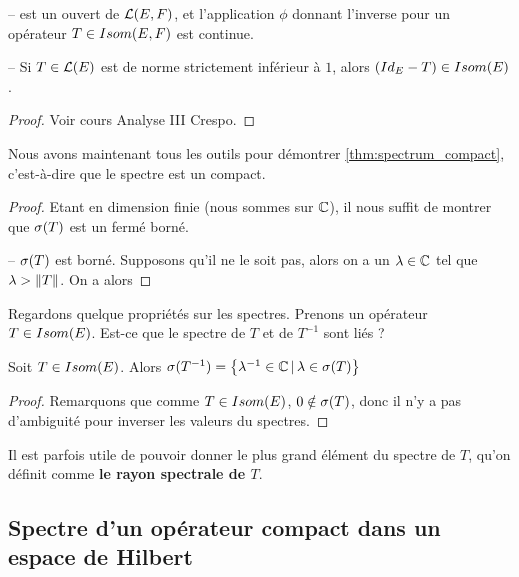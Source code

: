 \begin{proposition}
	--  est un ouvert de $\mathcal{L}(E, F)$, et
	l'application $\phi$ donnant l'inverse pour un opérateur $T \in
	Isom(E, F)$ est continue.

	-- Si $T \in \mathcal{L}(E)$ est de norme strictement inférieur à $1$,
	alors $(Id_{E} - T) \in Isom(E)$.
\end{proposition}

\begin{proof}
	Voir cours Analyse III Crespo.
\end{proof}

Nous avons maintenant tous les outils pour démontrer
\ref{thm:spectrum_compact}, c'est-à-dire que le spectre est un compact.

\begin{proof}
	Etant en dimension finie (nous sommes sur $\mathbb{C}$), il nous suffit de
	montrer que $\sigma(T)$ est un fermé borné.

	-- $\sigma(T)$ est borné. Supposons qu'il ne le soit pas, alors on a un
	$\lambda \in \mathbb{C}$ tel que $\lambda > \norm{T}$. On a alors 
\end{proof}


Regardons quelque propriétés sur les spectres. Prenons un opérateur $T \in
Isom(E)$. Est-ce que le spectre de $T$ et de $T^{-1}$ sont liés ?

\begin{proposition}
	Soit $T \in Isom(E)$. Alors $\sigma(T^{-1}) =
	\left\{\lambda^{-1} \in \mathbb{C} \, | \, \lambda \in \sigma(T) \right\}$
\end{proposition}

\begin{proof}
	Remarquons que comme $T \in Isom(E)$, $0 \notin \sigma(T)$,
	donc il n'y a pas d'ambiguité pour inverser les valeurs du spectres.
\end{proof}

Il est parfois utile de pouvoir donner le plus grand élément du spectre de $T$, qu'on
définit comme \textbf{le rayon spectrale de $T$}.




\subsection{Spectre d'un opérateur compact dans un espace de Hilbert}
